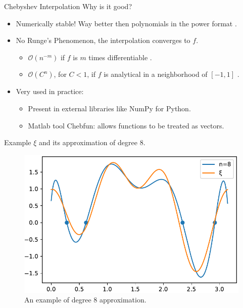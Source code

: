 \documentclass{beamer}
\newcommand{\bigO}{\mathscr{O}}
\begin{document}
\begin{frame}{Chebyshev Interpolation}
		Why is it good?
	
	\begin{itemize}
		\item Numerically stable! Way better then polynomials in the power format \cite{gautschi:1979}.
		
		\item No Runge's Phenomenon, the interpolation converges to $f$.
		\begin{itemize}
			\item $\bigO(n^{-m})$ if $f$ is $m$ times differentiable \cite[p.~28]{gottlieb}.
			\item $\bigO(C^n)$, for $C<1$, if $f$ is analytical in a neighborhood of $[-1, 1]$ \cite{battles:2004}.
		\end{itemize}
		
		\item Very used in practice: 
		\begin{itemize}
			\item Present in external libraries like NumPy for Python.
			\item Matlab tool Chebfun: allows functions to be treated as vectors.
		\end{itemize}
	\end{itemize}
\end{frame}


\begin{frame}{Example}
	$\xi$ and its approximation of degree $8$.
	\begin{figure}
		\centering
		
		\includegraphics[scale=.6]{inexn8}
		\caption{An example of degree $8$ approximation.}
	\end{figure}
\end{frame}
\end{document}
